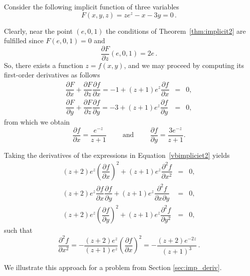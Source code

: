\begin{example}
Consider the following implicit function of three variables $$
F(x,y,z)=ze^z-x-3y=0\,.
$$

Clearly, near the point $(e,0,1)$ the conditions of Theorem~\ref{thm:implicit2} are fulfilled since $F(e,0,1)=0$ and 
$$
\dfrac{\partial F}{\partial z}(e,0,1)=2e\,.
$$
So, there exists a function $z=f(x,y)$, and we may proceed by computing its first-order derivatives as follows
\begin{equation}
\begin{array}{rcl}
\dfrac{\partial F}{\partial x}+\dfrac{\partial F}{\partial z}\dfrac{\partial f}{\partial x}=-1+(z+1)e^z\dfrac{\partial f}{\partial x}&=&0,\\[0.4cm]
\dfrac{\partial F}{\partial y}+\dfrac{\partial F}{\partial z}\dfrac{\partial f}{\partial y}=-3+(z+1)e^z\dfrac{\partial f}{\partial y}&=&0,
\end{array}
\label{vbimpliciet2}
\end{equation}
from which we obtain
$$
\dfrac{\partial f}{\partial x}=\dfrac{e^{-z}}{z+1}\qquad \text{ and } \qquad
\dfrac{\partial f}{\partial y}=\dfrac{3e^{-z}}{z+1}.
$$

Taking the derivatives of the expressions in Equation~\eqref{vbimpliciet2} yields 
\begin{equation*}
\begin{array}{rcl}
(z+2)e^z\left(\dfrac{\partial f}{\partial x}\right)^2+(z+1)e^z\dfrac{\partial^2 f}{\partial x^2}&=&0,\\[0.4cm]
(z+2)e^z\dfrac{\partial f}{\partial x}\dfrac{\partial f}{\partial y}+(z+1)e^z\dfrac{\partial^2 f}{\partial x\partial y}&=&0,\\[0.4cm]
(z+2)e^z\left(\dfrac{\partial f}{\partial y}\right)^2+(z+1)e^z\dfrac{\partial^2 f}{\partial y^2}&=&0,
\end{array}
\end{equation*}
such that
$$
\dfrac{\partial^2 f}{\partial x^2}=-\dfrac{(z+2)e^z}{(z+1)e^z}\left(\dfrac{\partial f}{\partial x}\right)^2=-\dfrac{(z+2)e^{-2z}}{(z+1)^3}\,.
$$
\end{example}


\fi

\ifcalculus
We illustrate this approach for a problem from Section \ref{sec:imp_deriv}.\\

